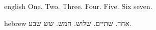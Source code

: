 \documentclass{article}
\begin{document}
\begin{mekor}
\begin{mekorlang}{english}{}
\pasuk[37:18] One. \pasuk Two. \pasuk[23] Three. \pasuk* Four.  Five. Six \dilug seven.
\end{mekorlang}
\begin{mekorlang}{hebrew}{}
\pasuk[37:18] אחד. \pasuk שתיים. \pasuk[23] שלוש.  חמש. שש \dilug שבע.
\end{mekorlang}
\end{mekor}
\end{document}
